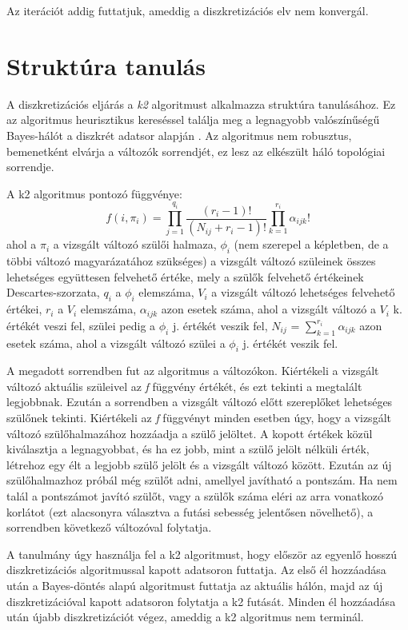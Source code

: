 Az iterációt addig futtatjuk, ameddig a diszkretizációs elv nem konvergál.

\section{Struktúra tanulás}
A diszkretizációs eljárás a \emph{k2} algoritmust alkalmazza struktúra tanulásához. Ez az algoritmus heurisztikus kereséssel találja meg a legnagyobb valószínűségű Bayes-hálót a diszkrét adatsor alapján \cite{ruiz2005illustration}. Az algoritmus nem robusztus, bemenetként elvárja a változók sorrendjét, ez lesz az elkészült háló topológiai sorrendje.

A k2 algoritmus pontozó függvénye:
$$ f(i, \pi_{i}) =
\prod_{j = 1}^{q_{i}} \frac{(r_{i} - 1)!}{(N_{ij} + r_{i} - 1)!}
\prod_{k = 1}^{r_{i}} \alpha_{ijk}!$$
ahol a $\pi_{i}$ a vizsgált változó szülői halmaza, $\phi_{i}$ (nem szerepel a képletben, de a többi változó magyarázatához szükséges) a vizsgált változó szüleinek összes lehetséges együttesen felvehető értéke, mely a szülők felvehető értékeinek Descartes-szorzata, $q_{i}$ a $\phi_{i}$ elemszáma, $V_{i}$ a vizsgált változó lehetséges felvehető értékei, $r_{i}$ a $V_{i}$ elemszáma, $\alpha_{ijk}$ azon esetek száma, ahol a vizsgált változó a $V_{i}$ k. értékét veszi fel, szülei pedig a $\phi_{i}$ j. értékét veszik fel, $N_{ij}$ = $\sum_{k = 1}^{r_{i}}\alpha_{ijk}$ azon esetek száma, ahol a vizsgált változó szülei a $\phi_{i}$ j. értékét veszik fel.

A megadott sorrendben fut az algoritmus a változókon. Kiértékeli a vizsgált változó aktuális szüleivel az \emph{f} függvény értékét, és ezt tekinti a megtalált legjobbnak. Ezután a sorrendben a vizsgált változó előtt szereplőket lehetséges szülőnek tekinti. Kiértékeli az \emph{f} függvényt minden esetben úgy, hogy a vizsgált változó szülőhalmazához hozzáadja a szülő jelöltet. A kopott értékek közül kiválasztja a legnagyobbat, és ha ez jobb, mint a szülő jelölt nélküli érték, létrehoz egy élt a legjobb szülő jelölt és a vizsgált változó között. Ezután az új szülőhalmazhoz próbál még szülőt adni, amellyel javítható a pontszám. Ha nem talál a pontszámot javító szülőt, vagy a szülők száma eléri az arra vonatkozó korlátot (ezt alacsonyra választva a futási sebesség jelentősen növelhető), a sorrendben következő változóval folytatja.

A tanulmány úgy használja fel a k2 algoritmust, hogy először az egyenlő hosszú diszkretizációs algoritmussal kapott adatsoron futtatja. Az első él hozzáadása után a Bayes-döntés alapú algoritmust futtatja az aktuális hálón, majd az új diszkretizációval kapott adatsoron folytatja a k2 futását. Minden él hozzáadása után újabb diszkretizációt végez, ameddig a k2 algoritmus nem terminál.

